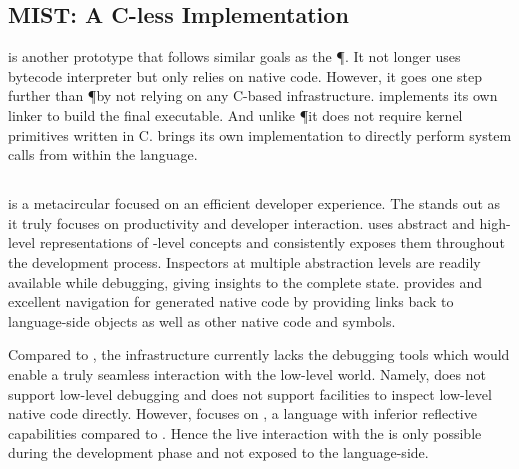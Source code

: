 \subsection{MIST: A C-less \ST Implementation}
 is another prototype \ST \VM that follows similar goals as the \P \VM.
It not longer uses bytecode interpreter but only relies on native code.
However, it goes one step further than \P by not relying on any C-based infrastructure.
\MIST implements its own linker to build the final executable.
And unlike \P it does not require kernel primitives written in C.
\MIST brings its own implementation to directly perform system calls from within the language.


\subsection{\Maxine \VM}
\Maxine is a metacircular \Java \VM \cite{Wimm13a} focused on an efficient developer experience.
The \Maxine \VM stands out as it truly focuses on productivity and developer interaction.
\Maxine uses abstract and high-level representations of \VM-level concepts and consistently exposes them throughout the development process.
Inspectors at multiple abstraction levels are readily available while debugging, giving insights to the complete \VM state.
\Maxine provides and excellent navigation for generated native code by providing links back to language-side objects as well as other native code and symbols.

Compared to \Maxine, the \B infrastructure currently lacks the debugging tools which would enable a truly seamless interaction with the low-level world.
Namely, \B does not support low-level debugging and does not support facilities to inspect low-level native code directly.
However, \Maxine focuses on \Java, a language with inferior reflective capabilities compared to \PH.
Hence the live interaction with the \VM is only possible during the development phase and not exposed to the language-side.


